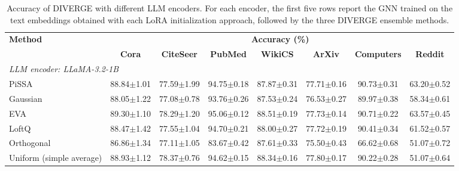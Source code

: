 \documentclass[a4paper,fleqn]{cas-sc}
\begin{document}
\begin{table}[htbp]
\centering
\caption{Accuracy of DIVERGE with different LLM encoders. For each encoder, the first five rows report the GNN trained on the text embeddings obtained with each LoRA initialization approach, followed by the three DIVERGE ensemble methods.}
\label{tab:diverge_llm_encoders}

\small
\setlength{\tabcolsep}{3pt}
\begin{tabular*}{\textwidth}{@{\extracolsep{\fill}} lccccccc @{}}
\toprule
\multirow{2}{*}{\textbf{Method}} & \multicolumn{7}{c}{\textbf{Accuracy (\%)}} \\
\cmidrule(lr){2-8}
 & \textbf{Cora} & \textbf{CiteSeer} & \textbf{PubMed} & \textbf{WikiCS} & \textbf{ArXiv} & \textbf{Computers} & \textbf{Reddit} \\
\midrule
\multicolumn{8}{l}{\textit{LLM encoder: LLaMA-3.2-1B}} \\
\midrule
PiSSA                     & 88.84{\scriptsize$\pm$1.01} & 77.59{\scriptsize$\pm$1.99} & 94.75{\scriptsize$\pm$0.18} & 87.87{\scriptsize$\pm$0.31} & 77.71{\scriptsize$\pm$0.16} & 90.73{\scriptsize$\pm$0.31} & 63.20{\scriptsize$\pm$0.52} \\
Gaussian                  & 88.05{\scriptsize$\pm$1.22} & 77.08{\scriptsize$\pm$0.78} & 93.76{\scriptsize$\pm$0.26} & 87.53{\scriptsize$\pm$0.24} & 76.53{\scriptsize$\pm$0.27} & 89.97{\scriptsize$\pm$0.38} & 58.34{\scriptsize$\pm$0.61} \\
EVA                       & 89.30{\scriptsize$\pm$1.10} & 78.29{\scriptsize$\pm$1.20} & 95.06{\scriptsize$\pm$0.12} & 88.51{\scriptsize$\pm$0.19} & 77.73{\scriptsize$\pm$0.14} & 90.71{\scriptsize$\pm$0.22} & 63.57{\scriptsize$\pm$0.45} \\
LoftQ                     & 88.47{\scriptsize$\pm$1.42} & 77.55{\scriptsize$\pm$1.04} & 94.70{\scriptsize$\pm$0.21} & 88.00{\scriptsize$\pm$0.27} & 77.72{\scriptsize$\pm$0.19} & 90.41{\scriptsize$\pm$0.34} & 61.52{\scriptsize$\pm$0.57} \\
Orthogonal                & 86.86{\scriptsize$\pm$1.34} & 77.11{\scriptsize$\pm$1.05} & 83.67{\scriptsize$\pm$0.42} & 87.61{\scriptsize$\pm$0.33} & 75.50{\scriptsize$\pm$0.43} & 66.62{\scriptsize$\pm$0.68} & 51.07{\scriptsize$\pm$0.72} \\
\cmidrule(lr){1-8}
Uniform (simple average)  & 88.93{\scriptsize$\pm$1.12} & 78.37{\scriptsize$\pm$0.76} & 94.62{\scriptsize$\pm$0.15} & 88.34{\scriptsize$\pm$0.16} & 77.80{\scriptsize$\pm$0.17} & 90.22{\scriptsize$\pm$0.28} & 51.07{\scriptsize$\pm$0.64} \\

\end{tabular*}
\end{table}
\end{document}
